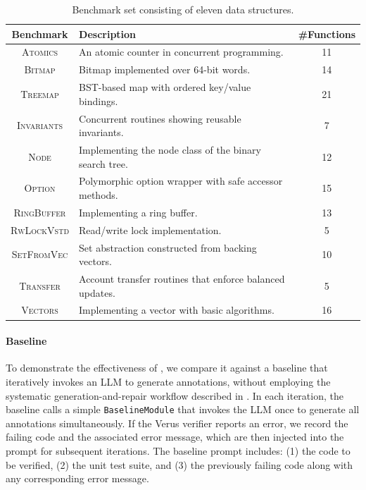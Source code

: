 \begin{table}[t]

\caption{Benchmark set consisting of eleven data structures.}
\label{tab:benchmarks}
\begin{small}
\begin{tabular}{|c|p{7.8cm}|c|}
\hline
\textbf{Benchmark} & \textbf{Description} & \textbf{\#Functions} \\
\hline
\textsc{Atomics} & An atomic counter in concurrent programming. & 11 \\
\hline
\textsc{Bitmap} & Bitmap implemented over 64-bit words. & 14 \\
\hline
\textsc{Treemap} & BST-based map with ordered key/value bindings. & 21 \\
\hline
\textsc{Invariants} & Concurrent routines showing reusable invariants. & 7 \\
\hline
\textsc{Node} & Implementing the node class of the binary search tree. & 12 \\
\hline
\textsc{Option} & Polymorphic option wrapper with safe accessor methods. & 15 \\
\hline
\textsc{RingBuffer} & Implementing a ring buffer. & 13 \\
\hline
\textsc{RwLockVstd} & Read/write lock implementation. & 5 \\
\hline
\textsc{SetFromVec} & Set abstraction constructed from backing vectors. & 10 \\
\hline
\textsc{Transfer} & Account transfer routines that enforce balanced updates. & 5 \\
\hline
\textsc{Vectors} & Implementing a vector with basic algorithms. & 16 \\
\hline
\end{tabular}
\end{small}
\end{table}

\paragraph{Baseline}
To demonstrate the effectiveness of \toolname{}, we compare it against a baseline that iteratively invokes an LLM to generate annotations, without employing the systematic generation-and-repair workflow described in . In each iteration, the baseline calls a simple \texttt{BaselineModule} that invokes the LLM once to generate all annotations simultaneously.
If the Verus verifier reports an error, we record the failing code and the associated error message, which are then injected into the prompt for subsequent iterations.
The baseline prompt includes: (1) the code to be verified, (2) the unit test suite, and (3) the previously failing code along with any corresponding error message.

